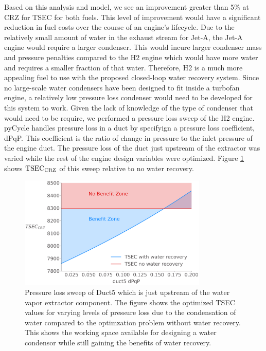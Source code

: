 \documentclass[conf]{new-aiaa}
\begin{document}
Based on this analysis and model, we see an improvement greater than 5\% at CRZ for TSEC for both fuels.
This level of improvement would have a significant reduction in fuel costs over the course of an engine's lifecycle.
Due to the relatively small amount of water in the exhaust stream for Jet-A, the Jet-A engine would require a larger condenser.
This would incure larger condenser mass and pressure penalties compared to the H2 engine which would have more water and requires a smaller fraction of that water.
Therefore, H2 is a much more appealing fuel to use with the proposed closed-loop water recovery system.
Since no large-scale water condensers have been designed to fit inside a turbofan engine, a relatively low pressure loss condenser would need to be developed for this system to work.
Given the lack of knowledge of the type of condenser that would need to be require, we performed a pressure loss sweep of the H2 engine.
pyCycle handles pressure loss in a duct by specifyign a pressure loss coefficient, dPqP.
This coefficient is the ratio of change in pressure to the inlet pressure of the engine duct.
The pressure loss of the duct just upstream of the extractor was varied while the rest of the engine design variables were optimized.
Figure \ref{fig:dpqp_sweep} shows $\rm{TSEC}_{\rm{CRZ}}$ of this sweep relative to no water recovery.

\begin{figure}[hbt!]
    \centering
    \includegraphics[width=0.8\textwidth]{N3_dpqp.pdf}
    \caption{Pressure loss sweep of Duct5 which is just upstream of the water vapor extractor component.
        The figure shows the optimized TSEC values for varying levels of pressure loss due to the condensation of water compared to the optimzation problem without water recovery.
        This shows the working space available for designing a water condensor while still gaining the benefits of water recovery.}
    \label{fig:dpqp_sweep}
\end{figure}
\end{document}
